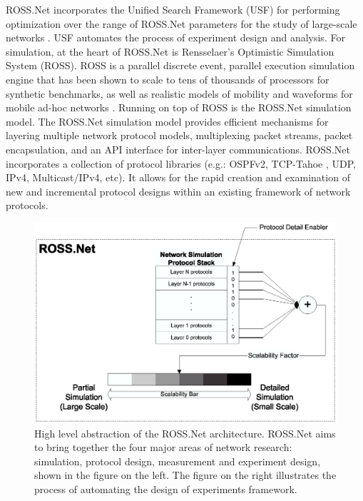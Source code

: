\documentclass[12pt]{article}
\begin{document}
ROSS.Net incorporates the Unified Search Framework (USF) for performing
optimization over the range of ROSS.Net parameters for the study of
large-scale networks \cite{ye-2003}.  USF automates the process of experiment
design and analysis.  For simulation, at the heart of ROSS.Net is Rensselaer's
Optimistic Simulation System (ROSS). ROSS is a parallel discrete event,
parallel execution simulation engine that has been shown to scale to tens of
thousands of processors for synthetic benchmarks, as well as realistic models
of mobility and waveforms for mobile ad-hoc networks
\cite{carothers-jpdc-2002}. Running on top of ROSS is the ROSS.Net simulation
model. The ROSS.Net simulation model provides efficient mechanisms for
layering multiple network protocol models, multiplexing packet streams, packet
encapsulation, and an API interface for inter-layer communications. ROSS.Net
incorporates a collection of protocol libraries (e.g.: OSPFv2, TCP-Tahoe
\cite{yaun-2003-2}, UDP, IPv4, Multicast/IPv4, etc). It allows for the rapid
creation and examination of new and incremental protocol designs within an
existing framework of network protocols.

\begin{figure}[!h]
\centering
\hspace{-0.5in}
\includegraphics[width=5in]{rn_architecture.ps}
\caption{High level abstraction of the ROSS.Net architecture.  ROSS.Net aims
  to bring together the four major areas of network research: simulation,
  protocol design, measurement and experiment design, shown in the figure on
  the left.  The figure on the right illustrates the process of automating the
  design of experiments framework.}
\label{fig-rn-arch2}
\end{figure}
\end{document}
